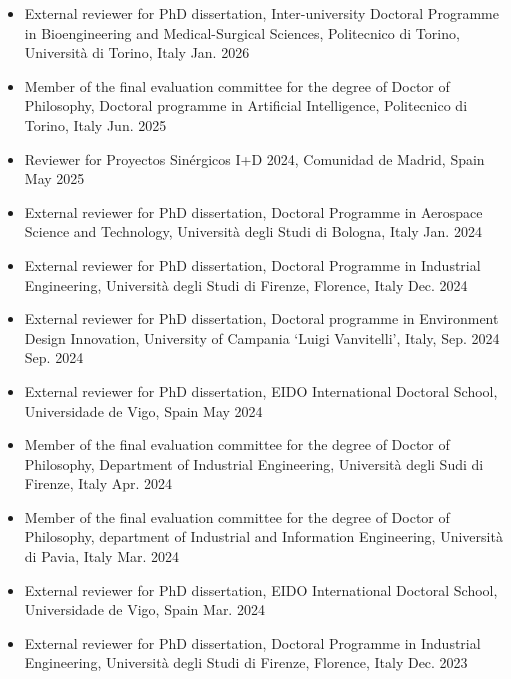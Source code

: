 \documentclass[11pt]{article}
\begin{document}
\begin{itemize}
		\item External reviewer for PhD dissertation, Inter-university Doctoral Programme in Bioengineering and Medical-Surgical Sciences, Politecnico di Torino, Università di Torino, Italy \hfill  Jan. 2026
		
		\item Member of the final evaluation committee for the degree of Doctor of Philosophy, Doctoral programme in Artificial Intelligence, Politecnico di Torino, Italy \hfill Jun. 2025
		
	  \item Reviewer for Proyectos Sinérgicos I+D 2024, Comunidad de Madrid, Spain \hfill May 2025
		
		\item External reviewer for PhD dissertation, Doctoral Programme in Aerospace Science and Technology, Università degli Studi di Bologna, Italy \hfill Jan. 2024
		
		\item External reviewer for PhD dissertation, Doctoral Programme in Industrial Engineering, Università degli Studi di Firenze, Florence, Italy \hfill Dec. 2024
		
		\item External reviewer for PhD dissertation, Doctoral programme in Environment Design Innovation, University of Campania `Luigi Vanvitelli', Italy, Sep. 2024 \hfill Sep. 2024
		
    \item External reviewer for PhD dissertation, EIDO International Doctoral School, Universidade de Vigo, Spain \hfill May 2024
		
		\item Member of the final evaluation committee for the degree of Doctor of Philosophy, Department of Industrial Engineering, Università degli Sudi di Firenze, Italy \hfill Apr. 2024
		
    \item Member of the final evaluation committee for the degree of Doctor of Philosophy, department of Industrial and Information Engineering, Università di Pavia, Italy \hfill Mar. 2024
		
    \item External reviewer for PhD dissertation, EIDO International Doctoral School, Universidade de Vigo, Spain \hfill Mar. 2024
		
    \item External reviewer for PhD dissertation, Doctoral Programme in Industrial Engineering, Università degli Studi di Firenze, Florence, Italy \hfill Dec. 2023
		

\end{itemize}
\end{document}
